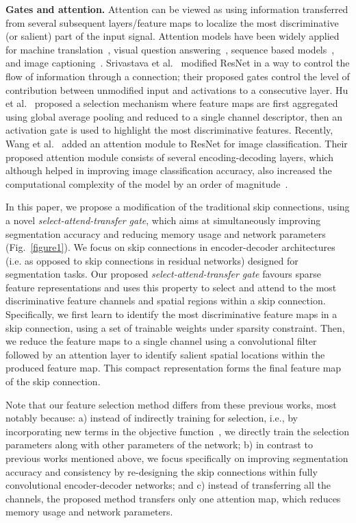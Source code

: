 \documentclass{article}
\begin{document}
\textbf{Gates and attention.} Attention can be viewed as using information transferred from several subsequent layers/feature maps to localize the most discriminative (or salient) part of the input signal. Attention models have been widely applied for machine translation~\cite{bahdanau2014neural}, visual question answering~\cite{das2017human}, sequence based models~\cite{luong2015effective}, and image captioning~\cite{xu2015show}. Srivastava et al.~\cite{srivastava2015highway} modified ResNet in a way to control the flow of information through a connection; their proposed gates control the level of contribution between unmodified input and activations to a consecutive layer. Hu et al.~\cite{hu2017squeeze} proposed a selection mechanism where feature maps are first aggregated using global average pooling and reduced to a single channel descriptor, then an activation gate is used to highlight the most discriminative features. Recently, Wang et al.~\cite{wang2017residual} added an attention module to ResNet for image classification. Their proposed attention module consists of several encoding-decoding layers, which although helped in improving image classification accuracy, also increased the computational complexity of the model by an order of magnitude~\cite{wang2017residual}.

In this paper, we propose a modification of the traditional skip connections, using a novel \emph{select-attend-transfer gate}, which aims at simultaneously improving segmentation accuracy and reducing memory usage and network parameters (Fig.~\ref{figure1}). We focus on skip connections in encoder-decoder architectures (i.e. as opposed to skip connections in residual networks) designed for segmentation tasks. Our proposed \emph{select-attend-transfer gate} favours sparse feature representations and uses this property to select and attend to the most discriminative feature channels and spatial regions within a skip connection. Specifically, we first learn to identify the most discriminative feature maps in a skip connection, using a set of trainable weights under sparsity constraint. Then, we reduce the feature maps to a single channel using a convolutional filter followed by an attention layer to identify salient spatial locations within the produced feature map. This compact representation forms the final feature map of the skip connection.

Note that our feature selection method differs from these previous works, most notably because: a) instead of indirectly training for selection, i.e., by incorporating new terms in the objective function~\cite{wen2016learning}, we directly train the selection parameters along with other parameters of the network; b) in contrast to previous works mentioned above, we focus specifically on improving segmentation accuracy and consistency by re-designing the skip connections within fully convolutional encoder-decoder networks; and c) instead of transferring all the channels, the proposed method transfers only one attention map, which reduces memory usage and network parameters.
\end{document}
